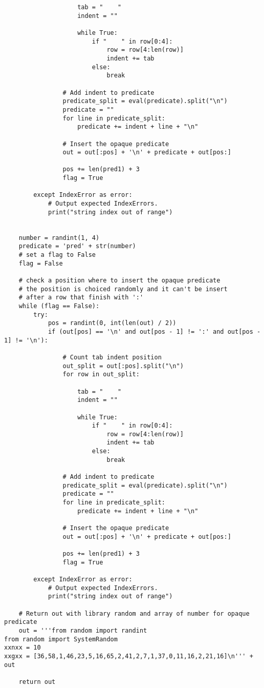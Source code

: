 \documentclass[a4paper,oneside,openright,titlepage,10pt,footinclude,headinclude]{scrbook}
\begin{document}
\begin{graybox}[innerleftmargin=2,]
\begin{lstlisting}
                    tab = "    "
                    indent = ""

                    while True:
                        if "    " in row[0:4]:
                            row = row[4:len(row)]
                            indent += tab
                        else:
                            break

                # Add indent to predicate
                predicate_split = eval(predicate).split("\n")
                predicate = ""
                for line in predicate_split:
                    predicate += indent + line + "\n"

                # Insert the opaque predicate
                out = out[:pos] + '\n' + predicate + out[pos:]
                
                pos += len(pred1) + 3
                flag = True

        except IndexError as error:
            # Output expected IndexErrors.
            print("string index out of range")

    
    number = randint(1, 4)
    predicate = 'pred' + str(number)
    # set a flag to False
    flag = False

    # check a position where to insert the opaque predicate
    # the position is choiced randomly and it can't be insert
    # after a row that finish with ':'
    while (flag == False):
        try:
            pos = randint(0, int(len(out) / 2))
            if (out[pos] == '\n' and out[pos - 1] != ':' and out[pos - 1] != '\n'):

                # Count tab indent position
                out_split = out[:pos].split("\n")
                for row in out_split:

                    tab = "    "
                    indent = ""

                    while True:
                        if "    " in row[0:4]:
                            row = row[4:len(row)]
                            indent += tab
                        else:
                            break

                # Add indent to predicate
                predicate_split = eval(predicate).split("\n")
                predicate = ""
                for line in predicate_split:
                    predicate += indent + line + "\n"

                # Insert the opaque predicate
                out = out[:pos] + '\n' + predicate + out[pos:]
                
                pos += len(pred1) + 3
                flag = True

        except IndexError as error:
            # Output expected IndexErrors.
            print("string index out of range")
    
    # Return out with library random and array of number for opaque predicate
    out = '''from random import randint
from random import SystemRandom
xxnxx = 10
xxgxx = [36,58,1,46,23,5,16,65,2,41,2,7,1,37,0,11,16,2,21,16]\n''' + out

    return out
\end{lstlisting}
\end{graybox}
\end{document}
